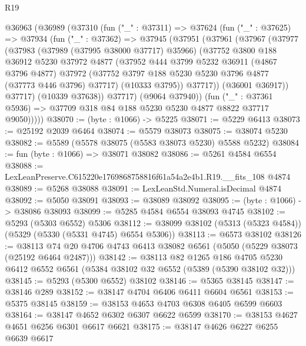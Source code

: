 \begin{lexlean}{R19}
\begin{coremodule}
  @36963
    (@36989
      (@37310
        (fun ("_" : @37311) =>
        @37624
          (fun ("_" : @37625) =>
          @37934
            (fun ("_" : @37362) =>
            @37945
              (@37951
                (@37961
                  (@37967
                    (@37977
                      (@37983
                        (@37989 (@37995 @38000 @37717) @35966)
                        (@37752
                          @3800
                          @188
                          @36912
                          @5230
                          @37972
                          @4877
                          (@37952
                            @444
                            @3799
                            @5232
                            @36911
                            (@4867 @3796 @4877)
                            @37972
                            (@37752 @3797 @188 @5230 @5230 @3796 @4877 (@37773 @446 @3796) @37717)
                            (@10333 @3795))
                          @37717))
                      (@36001 @36917))
                    @37717)
                  (@10339 @37638))
                @37717)
              (@9064 @37940))
            (fun ("_" : @37361 @5936) =>
            @37709 @318 @84 @188 @5230 @5230 @4877 @8822 @37717 @9050)))))
@38070 := (byte : @1066) -> @5225
@38071 := @5229 @6413
@38073 := @25192 @2039 @6464
@38074 := @5579 @38073
@38075 := @38074 @5230
@38082 := @5589 (@5578 @38075 (@5583 @38073 @5230) @5588 @5232)
@38084 := fun (byte : @1066) => @38071 @38082
@38086 := @5261 @4584 @6554
@38088 := LexLeanPreserve.C615220e1769868758816f61a54a2e4b1.R19.__fits_108 @4874
@38089 := @5268 @38088
@38091 := LexLeanStd.Numeral.isDecimal @4874
@38092 := @5050 @38091
@38093 := @38089 @38092
@38095 := (byte : @1066) -> @38086 @38093
@38099 := @5285 @4584 @6554 @38093 @4745
@38102 := @5293 (@5303 @6552) @5306
@38112 := @38099 @38102 (@5313 (@5323 @4584)) (@5329 (@5330 (@5331 @4745) @6554 @5306))
@38113 := @6573 @38102
@38126 := @38113 @74 @20 @4706 @4743 @6413 @38082 @6561 (@5050 (@5229 @38073 (@25192 @6464 @2487)))
@38142 := @38113
    @82
    @1265
    @186
    @4705
    @5230
    @6412
    @6552
    @6561
    (@5384 @38102 @32 @6552 (@5389 (@5390 @38102 @32)))
@38145 := @5293 (@5300 @6552) @38102
@38146 := @5365 @38145
@38147 := @38146 @289
@38152 := @38147 @4704 @6406 @6411 @6604 @6561
@38153 := @5375 @38145
@38159 := @38153 @4653 @4703 @6308 @6405 @6599 @6603
@38164 := @38147 @4652 @6302 @6307 @6622 @6599
@38170 := @38153 @4627 @4651 @6256 @6301 @6617 @6621
@38175 := @38147 @4626 @6227 @6255 @6639 @6617

\end{coremodule}
\end{lexlean}
